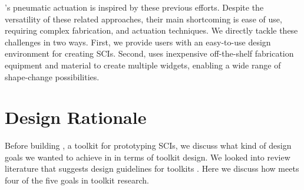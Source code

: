       \mp's pneumatic actuation is inspired by these previous efforts. Despite
      the versatility of these related approaches, their main shortcoming is
      ease of use, requiring complex fabrication, and actuation techniques. We
      directly tackle these challenges in two ways. First, we provide users with
      an easy-to-use design environment for creating SCIs. Second, \mp uses
      inexpensive off-the-shelf fabrication equipment and material to create
      multiple widgets, enabling a wide range of shape-change possibilities.

  \section{Design Rationale} 
    Before building \mp, a toolkit for prototyping SCIs, we discuss what
    kind of design goals we wanted to achieve in \mp in terms of toolkit design.
    We looked into review literature that suggests design guidelines for
    toolkits \cite{10.1145/3173574.3173610}. Here we discuss how \mp meets four
    of the five goals in toolkit research.
      
